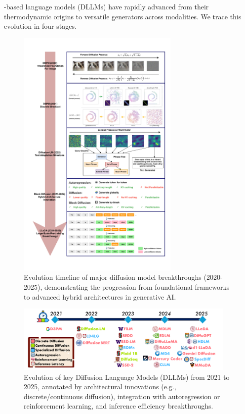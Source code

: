 -based language models (DLLMs) have rapidly advanced from their thermodynamic origins to versatile generators across modalities. We trace this evolution in four stages.

\begin{figure}[ht!]
    \centering
    \includegraphics[width=0.7\textwidth]{figs/diffusion.pdf}
    \caption{\centering Evolution timeline of major diffusion model breakthroughs (2020-2025), demonstrating the progression from foundational frameworks to advanced hybrid architectures in generative AI.}
    \label{fig:diffusion}
\end{figure}

\begin{figure}[t]
    \centering
    \includegraphics[width=0.95\textwidth]{figs/DLLMs_timeline.pdf}
    \caption{Evolution of key Diffusion Language Models (DLLMs) from 2021 to 2025, annotated by architectural innovations (e.g., discrete/continuous diffusion), integration with autoregression or reinforcement learning, and inference efficiency breakthroughs.}
    \label{fig:timeline}
\end{figure}

